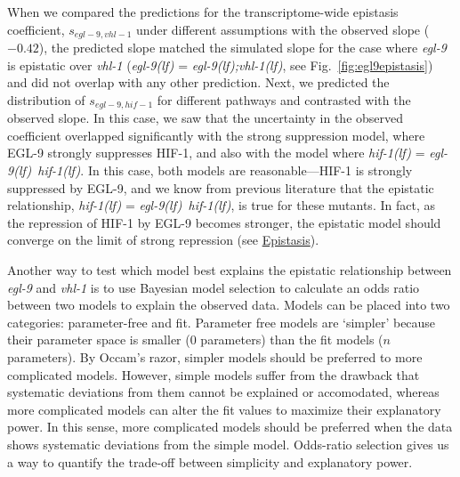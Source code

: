 \documentclass[9pt,twocolumn,twoside,lineno]{pnas-new}
\newcommand{\gene}[1]{\emph{#1}}
\newcommand{\egl}{\emph{\mbox{egl-9}(lf)}}
\newcommand{\eglvhl}{\emph{\mbox{egl-9(lf);vhl-1(lf)}}}
\newcommand{\eglhif}{\emph{\mbox{egl-9(lf)}~\mbox{hif-1(lf)}}}
\newcommand{\hif}{\emph{\mbox{hif-1(lf)}}}
\newcommand{\eglp}{EGL-9}
\newcommand{\hifp}{HIF-1}
\begin{document}
When we compared the predictions for the transcriptome-wide epistasis coefficient,
$s_{egl-9,vhl-1}$ under different assumptions with the observed slope ($-0.42$),
the predicted slope matched the simulated slope for the case where
\gene{egl-9} is epistatic over \gene{vhl-1} (\egl{} = \eglvhl{}, see
Fig.~\ref{fig:egl9epistasis}) and did not overlap with any other prediction.
Next, we predicted the distribution of $s_{egl-9,hif-1}$ for different pathways
and contrasted with the observed slope. In this case, we saw that the uncertainty
in the observed coefficient overlapped significantly with the strong suppression
model, where \eglp{} strongly suppresses \hifp{}, and also with the model where
\hif{} = \eglhif{}. In this case, both models are reasonable---\hifp{} is strongly
suppressed by \eglp{}, and we know from previous literature that the epistatic
relationship, \hif{} = \eglhif{}, is true for these mutants. In fact, as the
repression of \hifp{} by \eglp{} becomes stronger, the epistatic model should
converge on the limit of strong repression (see
\href{https://wormlabcaltech.github.io/mprsq/analysis_notebooks/epistasis_6.html}
{Epistasis}).

Another way to test which model best explains the epistatic relationship between
\gene{egl-9} and \gene{vhl-1} is to use Bayesian model selection to calculate
an odds ratio between two models to explain the observed data. Models can be placed
into two categories: parameter-free and fit. Parameter free models are `simpler'
because their parameter space is smaller (0 parameters) than the fit models ($n$
parameters). By Occam's razor, simpler models should be preferred to more
complicated models. However, simple models suffer from the drawback that
systematic deviations from them cannot be explained or accomodated, whereas more
complicated models can alter the fit values to maximize their explanatory power.
In this sense, more complicated models should be preferred when the data shows
systematic deviations from the simple model. Odds-ratio selection gives us a way
to quantify the trade-off between simplicity and explanatory power.
\end{document}
